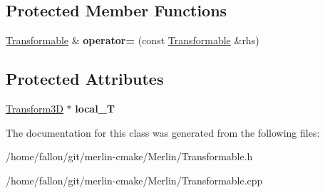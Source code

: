 \subsection*{Protected Member Functions}
\begin{DoxyCompactItemize}
\item 
\mbox{\label{classTransformable_a038369e14e302b3cc8b148eb4f0540c9}} 
\hyperlink{classTransformable}{Transformable} \& {\bfseries operator=} (const \hyperlink{classTransformable}{Transformable} \&rhs)
\end{DoxyCompactItemize}
\subsection*{Protected Attributes}
\begin{DoxyCompactItemize}
\item 
\mbox{\label{classTransformable_a7af1a26d89788e009075133e3dc85584}} 
\hyperlink{classTransform3D}{Transform3D} $\ast$ {\bfseries local\+\_\+T}
\end{DoxyCompactItemize}


The documentation for this class was generated from the following files\+:\begin{DoxyCompactItemize}
\item 
/home/fallon/git/merlin-\/cmake/\+Merlin/Transformable.\+h\item 
/home/fallon/git/merlin-\/cmake/\+Merlin/Transformable.\+cpp\end{DoxyCompactItemize}
